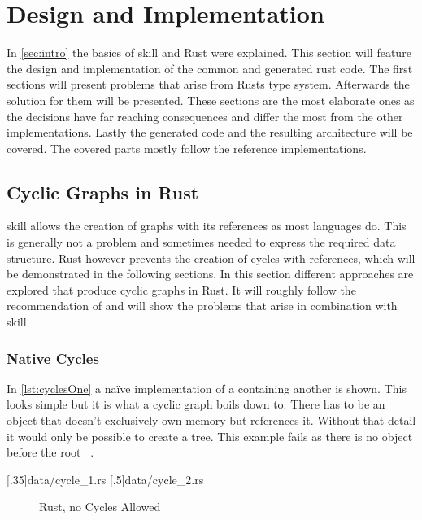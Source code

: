 \documentclass[thesis]{subfiles}
\begin{document}
\chapter{Design and Implementation}%
\vspace*{-1em}
In \autoref{sec:intro} the basics of \gls{skill} and Rust were explained.
This section will feature the design and implementation of the common and generated rust code.
The first sections will present problems that arise from Rusts type system.
Afterwards the solution for them will be presented.
These sections are the most elaborate ones as the decisions have far reaching consequences and differ the most from the other implementations.
Lastly the generated code and the resulting architecture will be covered.
The covered parts mostly follow the reference implementations.

\section{Cyclic Graphs in Rust}\label{sec:graph}
  \gls{skill} allows the creation of graphs with its references\autocite[9]{skill-dis} as most languages do.
  This is generally not a problem and sometimes needed to express the required data structure.
  Rust however prevents the creation of cycles with references, which will be demonstrated in the following sections.
  In this section different approaches are explored that produce cyclic graphs in Rust.
  It will roughly follow the recommendation of \autocite{rust-faq} and will show the problems that arise in combination with \gls{skill}.

  \subsection{Native Cycles}
    In \autoref{lst:cyclesOne} a na\"ive implementation of a \Node containing another \Node is shown.
    This looks simple but it is what a cyclic graph boils down to.
    There has to be an object that doesn't exclusively own memory but references it.
    Without that detail it would only be possible to create a tree.
    This example fails as there is no \Node object before the root \Node~.

    \LstTikzBox{\cyclesOne}[.35\linewidth]{data/cycle_1.rs}
    \LstTikzBox{\cyclesTwo}[.5\linewidth]{data/cycle_2.rs}

    \begin{figure}[ht]
      \captionsetup{type=lstlisting}
       \hfill%
      \caption{Rust, no Cycles Allowed}\label{lst:cycles}
    \end{figure}
\end{document}
